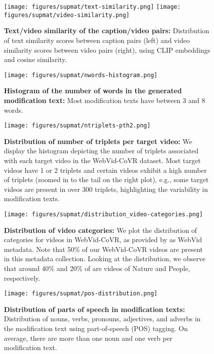 \begin{figure}
  \centering
  \texttt{[image: figures/supmat/text-similarity.png]}\hfill
  \texttt{[image: figures/supmat/video-similarity.png]}
    \caption{\textbf{Text/video similarity of the caption/video pairs:} 
    Distribution of text similarity scores between caption pairs  (left) 
    and video similarity scores between video pairs  (right),
    using CLIP embeddings and cosine similarity.}
  \label{app:fig:plot-similarity}
\end{figure}

\begin{figure}
  \centering
  \texttt{[image: figures/supmat/nwords-histogram.png]}
  \caption{\textbf{Histogram of the number of words in the generated modification text:} Most modification texts have between 3 and 8 words.
  }
  \label{app:fig:nwords-histogram}
\end{figure}

\begin{figure}
  \centering
  \texttt{[image: figures/supmat/ntriplets-pth2.png]}
    \caption{\textbf{Distribution of number of triplets per target video:} 
    We display the histogram depicting the number of triplets associated with each target video in the WebVid-CoVR dataset. 
    Most target videos have 1 or 2 triplets and certain videos exhibit 
    a high number of triplets (zoomed in to the tail on the right plot), e.g., some target videos are present in over 300 triplets, highlighting the variability in modification texts.
    }
  \label{app:fig:ntriplets-pth2}
\end{figure}



\begin{figure}\centering
  \texttt{[image: figures/supmat/distribution\_video-categories.png]}
  \vspace{-0.2cm}
  \caption{\textbf{Distribution of video categories:}  
  {We plot the distribution of categories for videos in WebVid-CoVR, as provided by \cite{cleanvid} as WebVid metadata. Note that 50\% of our WebVid-CoVR videos are present in this metadata collection.
  Looking at the distribution, we observe that around 40\% and 20\% of \ourDS are videos of Nature and People, respectively.}
  }
  \label{app:fig:video-categories}
\end{figure}

\begin{figure} \centering
  \vspace{0.1cm}
  \texttt{[image: figures/supmat/pos-distribution.png]}
  \vspace{-0.2cm}
  \caption{\textbf{Distribution of parts of speech in modification texts:}  
  Distribution of nouns, verbs, pronouns, adjectives, and adverbs in the modification text using part-of-speech (POS) tagging.
  On average, there are more than one noun and one verb per modification text.
  }
  \label{app:fig:pos-distribution}
\end{figure}


